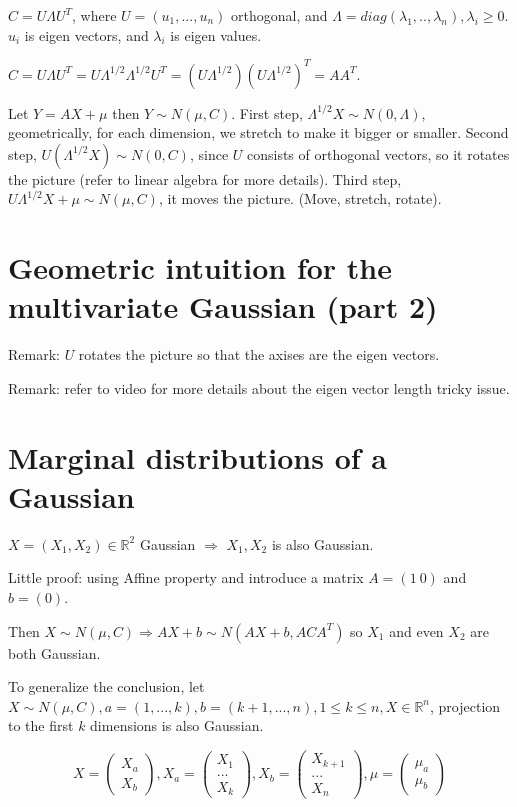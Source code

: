 \documentclass[12pt]{article}
\begin{document}
$C=U\Lambda U^T$, where $U=(u_1,...,u_n)$ orthogonal,
and $\Lambda=diag(\lambda_1,..,\lambda_n), \lambda_i\ge 0$.
$u_i$ is eigen vectors, and $\lambda_i$ is eigen values.

$C=U\Lambda U^T=U\Lambda^{1/2}\Lambda^{1/2}U^T=(U\Lambda^{1/2})(U\Lambda^{1/2})^T=AA^T$.

Let $Y=AX+\mu$ then $Y\sim N(\mu, C)$.
First step, $\Lambda^{1/2} X \sim N(0, \Lambda)$, geometrically,
for each dimension, we stretch to make it bigger or smaller.
Second step, $U(\Lambda^{1/2}X)\sim N(0,C)$, since $U$
consists of orthogonal vectors, so it rotates the picture (refer
to linear algebra for more details).
Third step, $U\Lambda^{1/2}X+\mu\sim N(\mu,C)$, it moves
the picture. (Move, stretch, rotate).

\section{Geometric intuition for the multivariate Gaussian (part 2)}

Remark: $U$ rotates the picture so that the axises are
the eigen vectors.

Remark: refer to video for more details about
the eigen vector length tricky issue.

\section{Marginal distributions of a Gaussian}

$X=(X_1,X_2)\in\mathbb{R}^2$ Gaussian $\Rightarrow$ $X_1,X_2$ is also Gaussian.

Little proof: using Affine property and introduce a matrix $A=(1\ 0)$ and $b=(0)$.

Then $X\sim N(\mu,C)\Rightarrow AX+b\sim N(AX+ b, ACA^T)$ so $X_1$ and even $X_2$ are both Gaussian.

To generalize the conclusion, let $X\sim N(\mu,C), a=(1,...,k), b=(k+1,...,n),1\le k\le n, X\in\mathbb{R}^n$,
projection to the first $k$ dimensions is also Gaussian.

\begin{equation}
    X=\begin{pmatrix}
        X_a \\
        X_b
    \end{pmatrix}
    ,
    X_a=\begin{pmatrix}
        X_1\\
        ...\\
        X_k
    \end{pmatrix}
    ,
    X_b=\begin{pmatrix}
        X_{k+1}\\
        ...\\
        X_n
    \end{pmatrix}
    ,
    \mu=\begin{pmatrix}
        \mu_a\\
        \mu_b
    \end{pmatrix}
\end{equation}
\end{document}
